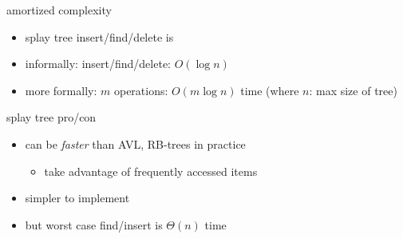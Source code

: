 \begin{frame}{amortized complexity}
    \begin{itemize}
        \item splay tree insert/find/delete is 
        \item informally:  insert/find/delete: $O(\log n)$
        \item more formally: $m$ operations: $O(m \log n)$ time (where $n$: max size of tree)
    \end{itemize}
\end{frame}

\begin{frame}{splay tree pro/con}
    \begin{itemize}
    \item can be \textit{faster} than AVL, RB-trees in practice
        \begin{itemize}
        \item take advantage of frequently accessed items
        \end{itemize}
    \item simpler to implement
        \vspace{.5cm}
    \item but worst case find/insert is $\Theta(n)$ time
    \end{itemize}
\end{frame}
